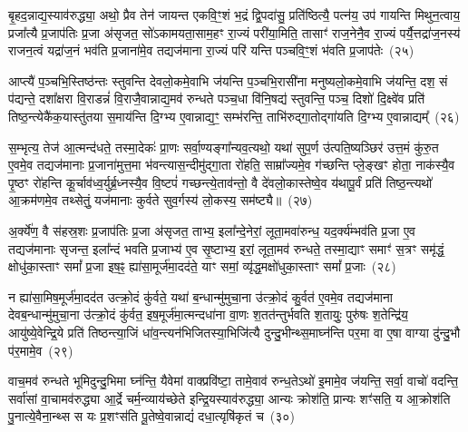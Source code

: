 बृ॒हद॒न्नाद्य॒स्याव॑रुद्ध्या॒ अथो॒ प्रैव तेन॑ जायन्त एकवि॒ꣳ॒शं भ॒द्रं द्वि॒पदा॑सु॒ प्रति॑ष्ठित्यै॒ पत्न॑य॒ उप॑ गायन्ति मिथुन॒त्वाय॒ प्रजा᳚त्यै प्र॒जा\-प॑तिः प्र॒जा अ॑सृजत॒ सो॑\-ऽकामयता॒साम॒हꣳ रा॒ज्यं परी॑या॒मिति॒ तासाꣳ॑ राज॒नेनै॒व रा॒ज्यं पर्यै॒त्तद्रा॑ज॒नस्य॑ राजन॒त्वं यद्रा॑ज॒नं भव॑ति प्र॒जाना॑मे॒व तद्यज॑माना रा॒ज्यं परि॑ यन्ति पञ्चवि॒ꣳ॒शं भ॑वति प्र॒जा\-प॑तेः~(२५)

आप्त्यै॑ प॒ञ्चभि॒स्तिष्ठ॑न्तः स्तुवन्ति देवलो॒कमे॒वाभि ज॑यन्ति प॒ञ्चभि॒रासी॑ना मनुष्यलो॒कमे॒वाभि ज॑यन्ति॒ दश॒ सं प॑द्यन्ते॒ दशा᳚क्षरा वि॒राडन्नं॑ वि॒राजै॒वान्नाद्य॒मव॑ रुन्धते पञ्च॒धा वि॑नि॒षद्य॑ स्तुवन्ति॒ पञ्च॒ दिशो॑ दि॒क्ष्वे॑व प्रति॑ तिष्ठ॒न्त्येकै॑क॒यास्तु॑तया स॒माय॑न्ति दि॒ग्भ्य ए॒वान्नाद्य॒ꣳ॒ सम्भ॑रन्ति॒ ताभि॑रुद्गा॒तोद्गा॑यति दि॒ग्भ्य ए॒वान्नाद्यम्᳚~(२६)

स॒म्भृत्य॒ तेज॑ आ॒त्मन्द॑धते॒ तस्मा॒देकः॑ प्रा॒णः सर्वा॒ण्यङ्गा᳚न्यव॒त्यथो॒ यथा॑ सुप॒र्ण उ॑त्पति॒ष्यञ्छिर॑ उत्त॒मं कु॑रु॒त ए॒वमे॒व तद्यज॑मानाः प्र॒जाना॑मुत्त॒मा भ॑वन्त्यास॒न्दीमु॑द्गा॒ता रो॑हति॒ साम्रा᳚ज्यमे॒व ग॑च्छन्ति प्ले॒ङ्खꣳ होता॒ नाक॑स्यै॒व पृ॒ष्ठꣳ रो॑हन्ति कू॒र्चाव॑ध्व॒र्युर्ब्र॒ध्नस्यै॒व वि॒ष्टपं॑ गच्छन्त्ये॒ताव॑न्तो॒ वै दे॑वलो॒कास्तेष्वे॒व य॑थापू॒र्वं प्रति॑ तिष्ठ॒न्त्यथो॑ आ॒क्रम॑णमे॒व तथ्सेतुं॒ यज॑मानाः कुर्वते सुव॒र्गस्य॑ लो॒कस्य॒ सम॑ष्ट्यै॥~(२७)

{\anuvakamend[{सद॑सः सप्तद॒शं प्र॒जा\-प॑तेर्गायति दि॒ग्भ्य ए॒वान्नाद्यं॒ प्रत्येका॑\-दश च}]}%

अ॒र्क्ये॑ण॒ वै स॑हस्र॒शः प्र॒जा\-प॑तिः प्र॒जा अ॑सृजत॒ ताभ्य॒ इला᳚न्दे॒नेरां॒ लूता॒मवा॑रुन्ध॒ यद॒र्क्य॑म्भव॑ति प्र॒जा ए॒व तद्यज॑मानाः सृजन्त॒ इला᳚न्दं भवति प्र॒जाभ्य॑ ए॒व सृ॒ष्टाभ्य॒ इरां॒ लूता॒मव॑ रुन्धते॒ तस्मा॒द्याꣳ समाꣳ॑ स॒त्रꣳ समृ॑द्धं॒ क्षोधु॑का॒स्ताꣳ समां᳚ प्र॒जा इष॒ꣴ॒ ह्या॑सा॒मूर्ज॑मा॒दद॑ते॒ याꣳ समां॒ व्यृ॑द्ध॒मक्षो॑धुका॒स्ताꣳ समां᳚ प्र॒जाः~(२८)

न ह्या॑सा॒मिष॒मूर्ज॑मा॒दद॑त उत्क्रो॒दं कु॑र्वते॒ यथा॑ ब॒न्धान्मु॑मुचा॒ना उ॑त्क्रो॒दं कु॒र्वत॑ ए॒वमे॒व तद्यज॑माना देवब॒न्धान्मु॑मुचा॒ना उ॑त्क्रो॒दं कु॑र्वत॒ इष॒मूर्ज॑मा॒त्मन्दधा॑ना वा॒णः श॒तत॑न्तुर्भवति श॒तायुः॒ पुरु॑षः श॒तेन्द्रि॑य॒ आयु॑ष्ये॒वेन्द्रि॒ये प्रति॑ तिष्ठन्त्या॒जिं धा॑व॒न्त्यन॑भिजितस्या॒भिजि॑त्यै दुन्दु॒भीन्थ्स॒माघ्न॑न्ति पर॒मा वा ए॒षा वाग्या दु॑न्दु॒भौ प॑र॒मामे॒व~(२९)

वाच॒मव॑ रुन्धते भूमिदुन्दु॒भिमा घ्न॑न्ति॒ यैवेमां वाक्प्रवि॑ष्टा॒ तामे॒वाव॑ रुन्ध॒ते\-ऽथो॑ इ॒मामे॒व ज॑यन्ति॒ सर्वा॒ वाचो॑ वदन्ति॒ सर्वा॑सां वा॒चामव॑रुद्ध्या आ॒र्द्रे चर्म॒न्व्याय॑च्छेते इन्द्रि॒यस्याव॑रुद्ध्या॒ आन्यः क्रोश॑ति॒ प्रान्यः शꣳ॑सति॒ य आ॒क्रोश॑ति पु॒नात्ये॒वैना॒न्थ्स स यः प्र॒शꣳस॑ति पू॒तेष्वे॒वान्नाद्यं॑ दधा॒त्यृषि॑कृतं च~(३०)

